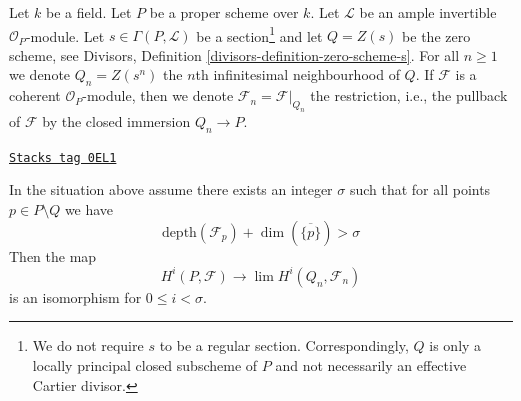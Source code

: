 \medskip\noindent
Let $k$ be a field. Let $P$ be a proper scheme over $k$.
Let $\mathcal{L}$ be an ample invertible $\mathcal{O}_P$-module.
Let $s \in \Gamma(P, \mathcal{L})$ be a section\footnote{We do not
require $s$ to be a regular section. Correspondingly, $Q$ is only
a locally principal closed subscheme of $P$ and not necessarily an effective
Cartier divisor.} and let
$Q = Z(s)$ be the zero scheme, see
Divisors, Definition \ref{divisors-definition-zero-scheme-s}.
For all $n \geq 1$ we denote $Q_n = Z(s^n)$
the $n$th infinitesimal neighbourhood of $Q$.
If $\mathcal{F}$ is a coherent $\mathcal{O}_P$-module, then we denote
$\mathcal{F}_n = \mathcal{F}|_{Q_n}$ the restriction, i.e.,
the pullback of $\mathcal{F}$ by the closed immersion
$Q_n \to P$.

\begin{proposition}[Lefschetz]
\label{algebraization-proposition-lefschetz}
\href{https://stacks.math.columbia.edu/tag/0EL1}{\texttt{Stacks tag 0EL1}}

In the situation above assume there exists an integer $\sigma$ such that
for all points $p \in P \setminus Q$ we have
$$
\text{depth}(\mathcal{F}_p) + \dim(\overline{\{p\}}) > \sigma
$$
Then the map
$$
H^i(P, \mathcal{F}) \longrightarrow \lim H^i(Q_n, \mathcal{F}_n)
$$
is an isomorphism for $0 \leq i < \sigma$.
\end{proposition}

